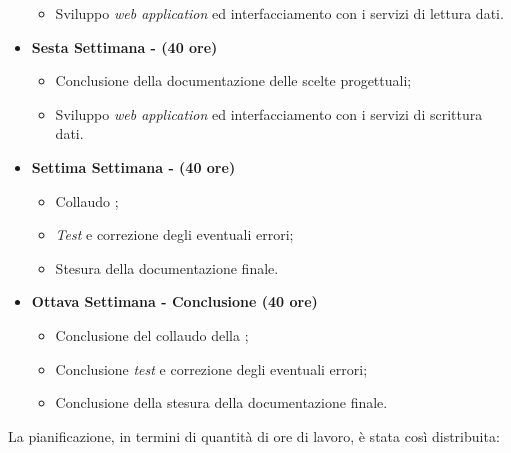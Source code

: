\begin{itemize}
\begin{itemize}
        \item Sviluppo \textit{web application} ed interfacciamento con i servizi  di lettura dati.
    \end{itemize}
    \item \textbf{Sesta Settimana - (40 ore)} 
    \begin{itemize}
        \item Conclusione della documentazione delle scelte progettuali;
        \item Sviluppo \textit{web application} ed interfacciamento con i servizi  di scrittura dati.
    \end{itemize}
    \item \textbf{Settima Settimana - (40 ore)} 
    \begin{itemize}
        \item Collaudo ;
        \item \textit{Test} e correzione degli eventuali errori;
        \item Stesura della documentazione finale.
    \end{itemize}
    \item \textbf{Ottava Settimana - Conclusione (40 ore)} 
    \begin{itemize}
        \item Conclusione del collaudo della ;
        \item Conclusione \textit{test} e correzione degli eventuali errori;
        \item Conclusione della stesura della documentazione finale.
    \end{itemize}
\end{itemize}

La pianificazione, in termini di quantità di ore di lavoro, è stata così distribuita: \\

